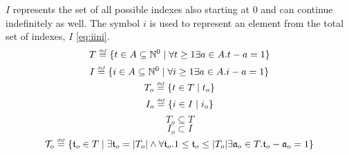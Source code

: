 \documentclass[]{article}
\newcommand{\defeq}{\stackrel{\smash{\scriptscriptstyle\mathit{def}}}{=}}
\begin{document}
\\
\\ 
$I$ represents the set of all possible indexes also starting at $0$ and can continue indefinitely as well. The symbol $i$ is used to represent an element from the total set of indexes, $I$ \eqref{eq:iini}. 
%
\begin{equation} \label{eq:time} 
T \defeq \{ t \in A \subseteq \mathbb{N}^{0} \mid  \forall t \geq 1\exists a \in A.t-a=1 \} 
\end{equation}
\begin{equation} \label {eq:index}
I \defeq \{ i \in A \subseteq \mathbb{N}^{0} \mid \forall i \geq 1 \exists a \in A.i-a=1 \}
\end{equation}
\begin{equation} \label{eq:object_time}
T_{o} \defeq \{ t \in T \mid t_{o} \}
\end{equation}
\begin{equation} \label {eq:object_index}
I_{o} \defeq \{ i \in I \mid i_{o} \}
\end{equation}
\begin{equation} \label{eq:subset_time}
T_{o} \subseteq T
\end{equation}
\begin{equation} \label {eq:subset_index}
I_{o} \subset I
\end{equation}
\begin{equation} \label{eq:relative_object_time} 
\mathcal{T}_{o} \defeq \{ \mathfrak{t}_{o} \in T \mid \exists \mathfrak{t}_{o} = |T_{o}| \wedge \forall \mathfrak{t}_{o}.1 \leq \mathfrak{t}_{o} \leq |T_{o}|  \exists \mathfrak{a}_{o} \in T.\mathfrak{t}_{o}-\mathfrak{a}_{o}=1 \} 
\end{equation}
\end{document}

